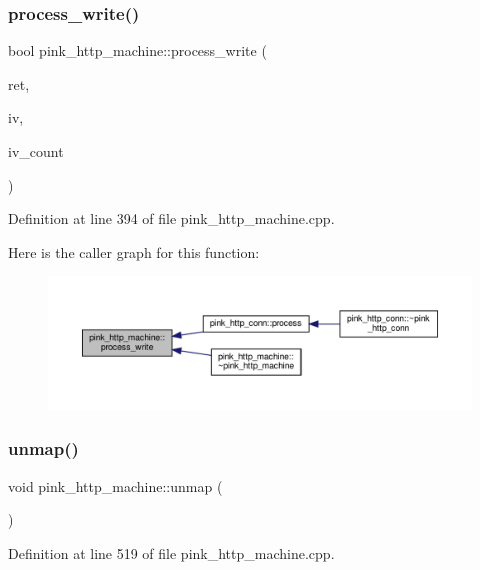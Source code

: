 \subsubsection{\texorpdfstring{process\+\_\+write()}{process\_write()}}
{\footnotesize\ttfamily bool pink\+\_\+http\+\_\+machine\+::process\+\_\+write (\begin{DoxyParamCaption}\item[{\hyperlink{classpink__http__machine_afb1e590cd61676c2f8859c4e01e5b150}{H\+T\+T\+P\+\_\+\+C\+O\+DE}}]{ret,  }\item[{struct iovec $\ast$}]{iv,  }\item[{int \&}]{iv\+\_\+count }\end{DoxyParamCaption})}



Definition at line 394 of file pink\+\_\+http\+\_\+machine.\+cpp.

Here is the caller graph for this function\+:
\nopagebreak
\begin{figure}[H]
\begin{center}
\leavevmode
\includegraphics[width=350pt]{classpink__http__machine_a7144e4279cd09ab8ce56873bd3906f24_icgraph}
\end{center}
\end{figure}
\mbox{\label{classpink__http__machine_a26debab8c361df5c79966f11e2b2dd17}} 
\subsubsection{\texorpdfstring{unmap()}{unmap()}}
{\footnotesize\ttfamily void pink\+\_\+http\+\_\+machine\+::unmap (\begin{DoxyParamCaption}{ }\end{DoxyParamCaption})}



Definition at line 519 of file pink\+\_\+http\+\_\+machine.\+cpp.

